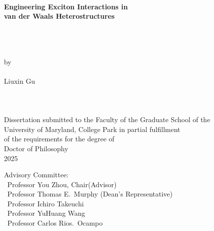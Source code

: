 
\thispagestyle{empty} \hbox{\ } \vspace{1.5in}
\renewcommand{\baselinestretch}{1}
\small\normalsize
\begin{center}

  {\bfseries\fontsize{20}{28}\selectfont
    Engineering Exciton Interactions in\\
    van der Waals Heterostructures\par}
\ \\
\ \\
\ \\
\large{by} \\
\ \\
\large{Liuxin Gu}%
\ \\
\ \\
\ \\
\ \\
\normalsize
Dissertation submitted to the Faculty of the Graduate School of the \\
University of Maryland, College Park in partial fulfillment \\
of the requirements for the degree of \\
Doctor of Philosophy \\
2025

\end{center}

\vspace{7.5em}

\noindent Advisory Committee: \\
\hbox{\ }\hspace{.5in}Professor You Zhou, Chair(Advisor) \\
\hbox{\ }\hspace{.5in}Professor Thomas E.\ Murphy (Dean's Representative) \\
\hbox{\ }\hspace{.5in}Professor Ichiro Takeuchi \\
\hbox{\ }\hspace{.5in}Professor YuHuang Wang \\
\hbox{\ }\hspace{.5in}Professor Carlos Rios.\ Ocampo
